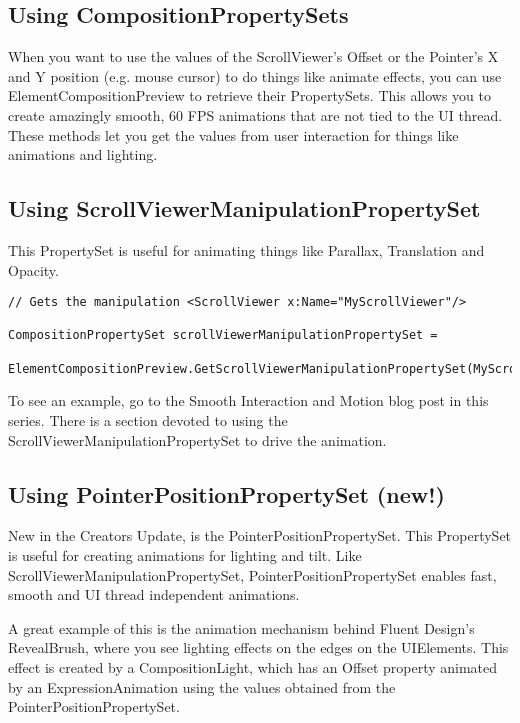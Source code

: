 \subsection{Using CompositionPropertySets}

When you want to use the values of the ScrollViewer’s Offset or the Pointer’s X and Y position (e.g. mouse cursor) to do things like animate effects, you can use ElementCompositionPreview to retrieve their PropertySets. This allows you to create amazingly smooth, 60 FPS animations that are not tied to the UI thread. These methods let you get the values from user interaction for things like animations and lighting.

\subsection{Using ScrollViewerManipulationPropertySet}

This PropertySet is useful for animating things like Parallax, Translation and Opacity.

\begin{lstlisting}[style=CSharpStyle]
// Gets the manipulation <ScrollViewer x:Name="MyScrollViewer"/>

CompositionPropertySet scrollViewerManipulationPropertySet = 

ElementCompositionPreview.GetScrollViewerManipulationPropertySet(MyScrollViewer);
\end{lstlisting}

To see an example, go to the Smooth Interaction and Motion blog post in this series. There is a section devoted to using the ScrollViewerManipulationPropertySet to drive the animation.

\subsection{Using PointerPositionPropertySet (new!)}

New in the Creators Update, is the PointerPositionPropertySet. This PropertySet is useful for creating animations for lighting and tilt. Like ScrollViewerManipulationPropertySet, PointerPositionPropertySet enables fast, smooth and UI thread independent animations.

A great example of this is the animation mechanism behind Fluent Design’s RevealBrush, where you see lighting effects on the edges on the UIElements. This effect is created by a CompositionLight, which has an Offset property animated by an ExpressionAnimation using the values obtained from the PointerPositionPropertySet.

